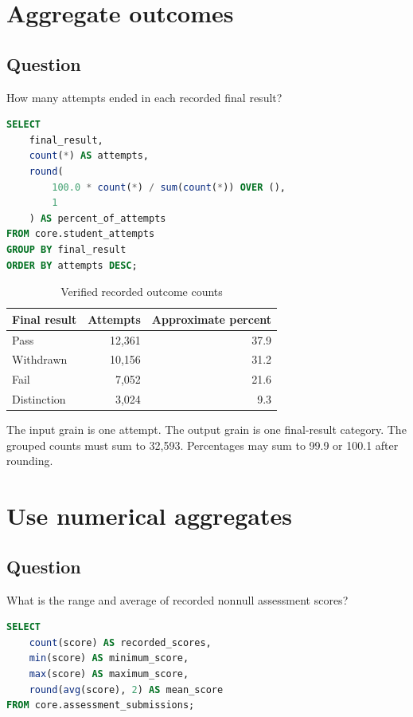 \section{Aggregate outcomes}

\subsection{Question}
How many attempts ended in each recorded final result?

\begin{lstlisting}[language=SQL]
SELECT
    final_result,
    count(*) AS attempts,
    round(
        100.0 * count(*) / sum(count(*)) OVER (),
        1
    ) AS percent_of_attempts
FROM core.student_attempts
GROUP BY final_result
ORDER BY attempts DESC;
\end{lstlisting}

\begin{table}[htbp]
\centering
\caption{Verified recorded outcome counts}
\label{tab:outcome-counts}
\begin{tabular}{lrr}
\toprule
Final result & Attempts & Approximate percent \\
\midrule
Pass & 12,361 & 37.9 \\
Withdrawn & 10,156 & 31.2 \\
Fail & 7,052 & 21.6 \\
Distinction & 3,024 & 9.3 \\
\bottomrule
\end{tabular}
\end{table}

The input grain is one attempt. The output grain is one final-result category.
The grouped counts must sum to 32,593. Percentages may sum to 99.9 or 100.1
after rounding.

\section{Use numerical aggregates}

\subsection{Question}
What is the range and average of recorded nonnull assessment scores?

\begin{lstlisting}[language=SQL]
SELECT
    count(score) AS recorded_scores,
    min(score) AS minimum_score,
    max(score) AS maximum_score,
    round(avg(score), 2) AS mean_score
FROM core.assessment_submissions;
\end{lstlisting}

